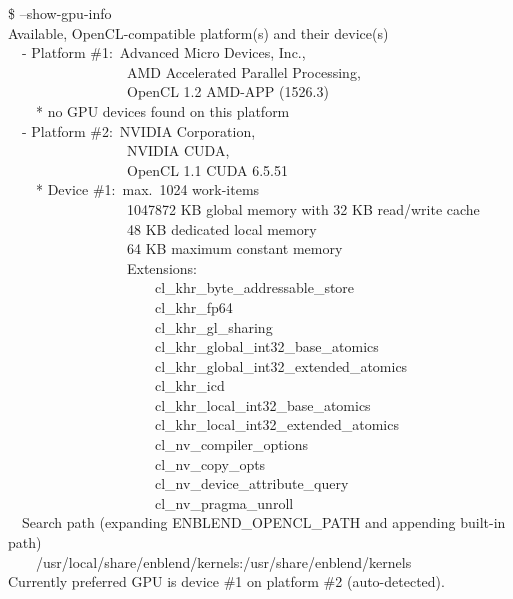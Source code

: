 \begin{codelist}
  \begin{exemplar}
    \begin{maxipage}
      \begin{terminal}
        \$ \app{} --show-gpu-info \\
        Available, OpenCL-compatible platform(s) and their device(s) \\
        ~~- Platform \#1:~Advanced Micro Devices, Inc., \\
        ~~~~~~~~~~~~~~~~~AMD Accelerated Parallel Processing, \\
        ~~~~~~~~~~~~~~~~~OpenCL 1.2 AMD-APP (1526.3) \\
        ~~~~* no GPU devices found on this platform \\
        ~~- Platform \#2:~NVIDIA Corporation, \\
        ~~~~~~~~~~~~~~~~~NVIDIA CUDA, \\
        ~~~~~~~~~~~~~~~~~OpenCL 1.1 CUDA 6.5.51 \\
        ~~~~* Device \#1:~max.~1024 work-items \\
        ~~~~~~~~~~~~~~~~~1047872 KB global memory with 32 KB read/write cache \\
        ~~~~~~~~~~~~~~~~~48 KB dedicated local memory \\
        ~~~~~~~~~~~~~~~~~64 KB maximum constant memory \\
        ~~~~~~~~~~~~~~~~~Extensions: \\
        ~~~~~~~~~~~~~~~~~~~~~cl\_khr\_byte\_addressable\_store \\
        ~~~~~~~~~~~~~~~~~~~~~cl\_khr\_fp64 \\
        ~~~~~~~~~~~~~~~~~~~~~cl\_khr\_gl\_sharing \\
        ~~~~~~~~~~~~~~~~~~~~~cl\_khr\_global\_int32\_base\_atomics \\
        ~~~~~~~~~~~~~~~~~~~~~cl\_khr\_global\_int32\_extended\_atomics \\
        ~~~~~~~~~~~~~~~~~~~~~cl\_khr\_icd \\
        ~~~~~~~~~~~~~~~~~~~~~cl\_khr\_local\_int32\_base\_atomics \\
        ~~~~~~~~~~~~~~~~~~~~~cl\_khr\_local\_int32\_extended\_atomics \\
        ~~~~~~~~~~~~~~~~~~~~~cl\_nv\_compiler\_options \\
        ~~~~~~~~~~~~~~~~~~~~~cl\_nv\_copy\_opts \\
        ~~~~~~~~~~~~~~~~~~~~~cl\_nv\_device\_attribute\_query \\
        ~~~~~~~~~~~~~~~~~~~~~cl\_nv\_pragma\_unroll \\
        ~~Search path (expanding ENBLEND\_OPENCL\_PATH and appending built-in path) \\
        ~~~~/usr/local/share/enblend/kernels:/usr/share/enblend/kernels \\
        Currently preferred GPU is device \#1 on platform \#2 (auto-detected).
      \end{terminal}
    \end{maxipage}


\end{exemplar}
\end{codelist}
